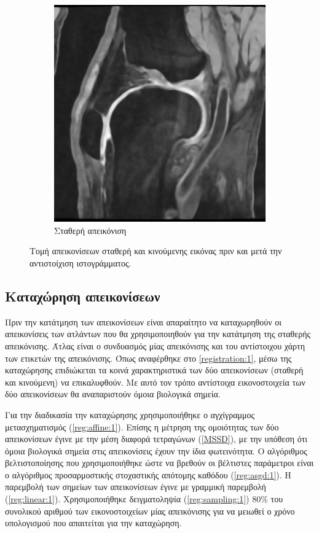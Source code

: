 \documentclass[a4paper,12pt]{article}
\begin{document}
\begin{figure}[H]
    \begin{subfigure}[t]{0.4\linewidth}
    \includegraphics[width=\linewidth]{curvature_1.png}
    \caption{Σταθερή απεικόνιση}
    \end{subfigure}

    \caption{Τομή απεικονίσεων σταθερή και κινούμενης εικόνας πριν και μετά την
             αντιστοίχιση ιστογράμματος.}
    \label{fig:histogram_matching:2}
\end{figure}


\subsection{Καταχώρηση απεικονίσεων}

Πριν την κατάτμηση των απεικονίσεων είναι απαραίτητο να καταχωρηθούν οι
απεικονίσεις των ατλάντων που θα χρησιμοποιηθούν για την κατάτμηση της σταθερής
απεικόνισης. Άτλας είναι ο συνδυασμός μίας απεικόνισης και του αντίστοιχου χάρτη
των ετικετών της απεικόνισης. Όπως αναφέρθηκε στο \ref{registration:1}, μέσω της
καταχώρησης επιδιώκεται τα κοινά χαρακτηριστικά των δύο απεικονίσεων (σταθερή
και κινούμενη) να επικαλυφθούν. Με αυτό τον τρόπο αντίστοιχα εικονοστοιχεία των
δύο απεικονίσεων θα αναπαριστούν όμοια βιολογικά σημεία.

Για την διαδικασία την καταχώρησης χρησιμοποιήθηκε ο αγχίγραμμος μετασχηματισμός
(\ref{reg:affine:1}). Επίσης η μέτρηση της ομοιότητας των δύο απεικονίσεων έγινε
με την μέση διαφορά τετραγώνων (\ref{MSSD}), με την υπόθεση ότι όμοια βιολογικά
σημεία στις απεικονίσεις έχουν την ίδια φωτεινότητα. Ο αλγόριθμος
βελτιστοποίησης που χρησιμοποιήθηκε ώστε να βρεθούν οι βέλτιστες παράμετροι
είναι ο αλγόριθμος προσαρμοστικής στοχαστικής απότομης καθόδου
(\ref{reg:asgd:1}). Η παρεμβολή των σημείων των απεικονίσεων έγινε με γραμμική
παρεμβολή (\ref{reg:linear:1}).  Χρησιμοποιήθηκε δειγματοληψία
(\ref{reg:sampling:1}) $80\%$ του συνολικού αριθμού των εικονοστοιχείων μίας
απεικόνισης για να μειωθεί ο χρόνο υπολογισμού που απαιτείται για την
καταχώρηση.
\end{document}
